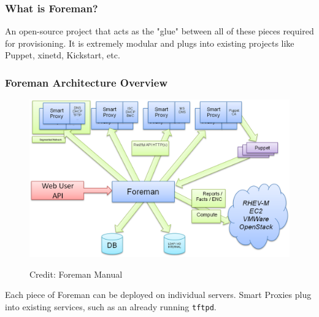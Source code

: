 \documentclass{beamer}
\begin{document}
\begin{frame}
 \frametitle{What is Foreman?}
 An open-source project that acts as the "glue" between all of these pieces required for provisioning.
 It is extremely modular and plugs into existing projects like Puppet, xinetd, Kickstart, etc.
\end{frame}

\begin{frame}
 \frametitle{Foreman Architecture Overview}
 \centering
 \begin{figure}[t]
  \includegraphics[width=\textwidth,height=\textheight-4cm,keepaspectratio]{foreman_architecture}

  \tiny Credit: Foreman Manual
 \end{figure}
 Each piece of Foreman can be deployed on individual servers. Smart Proxies plug into existing services, such as an already running \texttt{tftpd}.
\end{frame}
\end{document}
